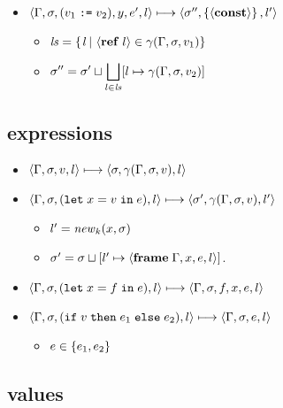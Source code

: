 \documentclass{article}
\begin{document}
\begin{minipage}{\textwidth}
\begin{minipage}[t]{0.49\textwidth}
\begin{itemize}
\item $\langle\Gamma,\sigma,(v_1\; \text{\texttt{:=}}\; v_2),y,e',l\rangle \longmapsto \langle\sigma'',\left\{\langle\mathbf{const}\rangle\right\},l'\rangle$

\begin{itemize}
\item $\mathit{ls}=\left\{\left. l \,\right|\, \langle\mathbf{ref}\; l\rangle\in\gamma(\Gamma,\sigma,v_1) \right\}$
\item $\displaystyle \sigma''=\sigma'\sqcup\bigsqcup_{l\in\mathit{ls}}[l\mapsto\gamma(\Gamma,\sigma,v_2)]$
\end{itemize}
\end{itemize}

\end{minipage}
\begin{minipage}[t]{0.5\textwidth}

\subsection{expressions}
\begin{itemize}
\item $\langle\Gamma,\sigma,v,l\rangle \longmapsto \langle \sigma,\gamma(\Gamma,\sigma,v),l \rangle$

\item $\langle\Gamma,\sigma,(\mathtt{let}\; x=v\; \mathtt{in}\; e),l\rangle \longmapsto \langle\sigma',\gamma(\Gamma,\sigma,v),l'\rangle$

\begin{itemize}
\item $l'=\mathit{new}_k(x,\sigma)$
\item $\sigma' = \sigma\sqcup[l'\mapsto\langle\mathbf{frame}\; \Gamma,x,e,l\rangle]$.
\end{itemize}

\item $\langle\Gamma,\sigma,(\mathtt{let}\; x=f\; \mathtt{in}\; e),l\rangle \longmapsto \langle\Gamma,\sigma,f,x, e, l\rangle$

\item $\langle\Gamma,\sigma,(\mathtt{if}\; v\; \mathtt{then}\; e_1\; \mathtt{else}\; e_2),l\rangle \longmapsto \langle\Gamma,\sigma, e, l\rangle$

\begin{itemize}
  \item $e\in\left\{e_1,e_2\right\}$
\end{itemize}
\end{itemize}

\subsection{values}


\end{minipage}
\end{minipage}
\end{document}
